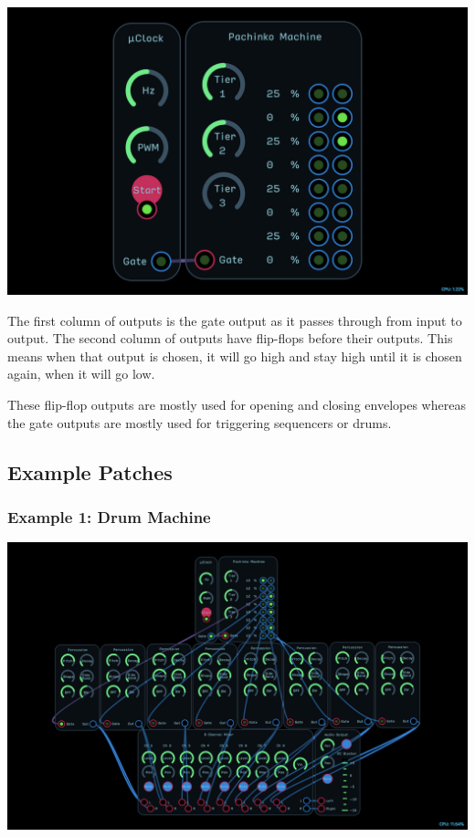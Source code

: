 \documentclass[11pt]{book}
\begin{document}
\begin{multicols*}{2}
\begin{center}
\includegraphics[width=0.95\linewidth]{pachinko-machine-fig5.png}
\end{center}

The first column of outputs is the gate output as it passes through from input to output. The second column of outputs have flip-flops before their outputs. This means when that output is chosen, it will go high and stay high until it is chosen again, when it will go low.

These flip-flop outputs are mostly used for opening and closing envelopes whereas the gate outputs are mostly used for triggering sequencers or drums.


\subsection*{Example Patches}

\subsubsection*{Example 1: Drum Machine}

\begin{center}
\includegraphics[width=0.95\linewidth]{pachinko-machine-fig6.png}
\end{center}


\end{multicols*}
\end{document}
